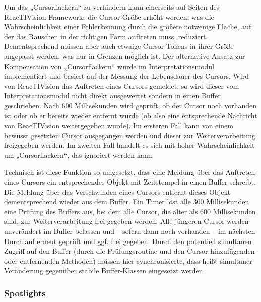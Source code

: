 Um das „Cursorflackern“ zu verhindern kann einerseits auf Seiten des ReacTIVision-Frameworks die Cursor-Größe erhöht werden, was die Wahrscheinlichkeit einer Fehlerkennung durch die größere notwenige Fläche, auf der das Rauschen in der richtigen Form auftreten muss, reduziert. Dementsprechend müssen aber auch etwaige Cursor-Tokens in ihrer Größe angepasst werden, was nur in Grenzen möglich ist. Der alternative Ansatz zur Kompensation von „Cursorflackern“ wurde im Interpretationsmodul implementiert und basiert auf der Messung der Lebensdauer des Cursors. Wird von ReacTIVision das Auftreten eines Cursors gemeldet, so wird dieser vom Interpretationsmodul nicht direkt ausgewertet sondern in einen Buffer geschrieben. Nach 600 Millisekunden wird geprüft, ob der Cursor noch vorhanden ist oder ob er bereits wieder entfernt wurde (ob also eine entsprechende Nachricht von ReacTIVision weitergegeben wurde). Im ersteren Fall kann von einem bewusst gesetzten Cursor ausgegangen werden und dieser zur Weiterverarbeitung freigegeben werden. Im zweiten Fall handelt es sich mit hoher Wahrscheinlichkeit um „Cursorflackern“, das ignoriert werden kann. 

Technisch ist diese Funktion so umgesetzt, dass eine Meldung über das Auftreten eines Cursors ein entsprechendes Objekt mit Zeitstempel in einen Buffer schreibt. Die Meldung über das Verschwinden eines Cursors entfernt dieses Objekt dementsprechend wieder aus dem Buffer. Ein Timer löst alle 300 Millisekunden eine Prüfung des Buffers aus, bei dem alle Cursor, die älter als 600 Millisekunden sind, zur Weiterverarbeitung frei gegeben werden. Alle jüngeren Cursor werden unverändert im Buffer belassen und -- sofern dann noch vorhanden -- im nächsten Durchlauf erneut geprüft und ggf. frei gegeben. Durch den potentiell simultanen Zugriff auf den Buffer (durch die Prüfungsroutine und den Cursor hinzufügenden oder entfernenden Methoden) müssen hier synchronisierte, dass heißt simultaner Veränderung gegenüber stabile Buffer-Klassen eingesetzt werden.


\subsubsection{Spotlights} %
\label{ssub:spotlights}

